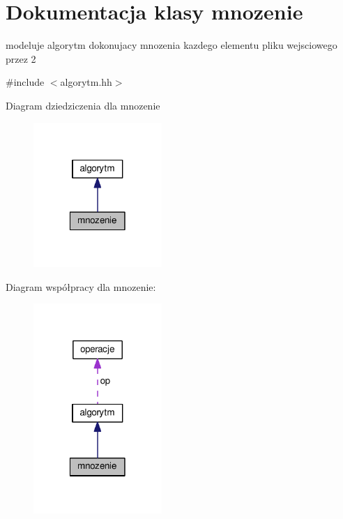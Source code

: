 \hypertarget{classmnozenie}{\section{Dokumentacja klasy mnozenie}
\label{classmnozenie}
}


modeluje algorytm dokonujacy mnozenia kazdego elementu pliku wejsciowego przez 2  




{\ttfamily \#include $<$algorytm.\-hh$>$}



Diagram dziedziczenia dla mnozenie\nopagebreak
\begin{figure}[H]
\begin{center}
\leavevmode
\includegraphics[width=138pt]{classmnozenie__inherit__graph}
\end{center}
\end{figure}


Diagram współpracy dla mnozenie\-:\nopagebreak
\begin{figure}[H]
\begin{center}
\leavevmode
\includegraphics[width=138pt]{classmnozenie__coll__graph}
\end{center}
\end{figure}
